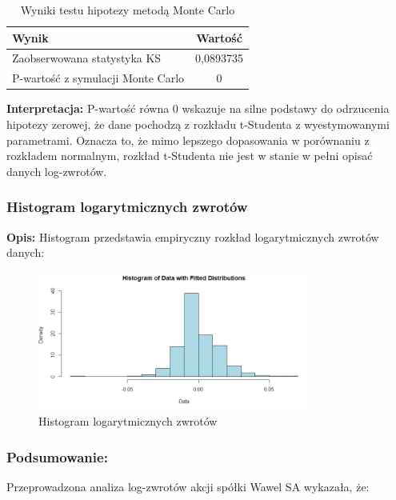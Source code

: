 \documentclass[a4paper,11pt]{article}
\begin{document}
\begin{table}[H]
    \centering
    \begin{tabular}{|p{7cm}|c|}
        \hline
        \textbf{Wynik} & \textbf{Wartość} \\
        \hline
        Zaobserwowana statystyka KS & 0,0893735 \\
        P-wartość z symulacji Monte Carlo & 0 \\
        \hline
    \end{tabular}
    \caption{Wyniki testu hipotezy metodą Monte Carlo}
    \label{tab:test_results}
\end{table}


\textbf{Interpretacja:} P-wartość równa 0 wskazuje na silne podstawy do odrzucenia hipotezy zerowej, że dane pochodzą z rozkładu t-Studenta z wyestymowanymi parametrami. Oznacza to, że mimo lepszego dopasowania w porównaniu z rozkładem normalnym, rozkład t-Studenta nie jest w stanie w pełni opisać danych log-zwrotów.

\subsubsection*{Histogram logarytmicznych zwrotów}

\textbf{Opis:} Histogram przedstawia empiryczny rozkład logarytmicznych zwrotów danych:

\begin{figure}[H]
    \centering
    \includegraphics[width=0.8\textwidth]{./Wojtek/histogram_log_returns.png}
    \caption{Histogram logarytmicznych zwrotów}
    \label{fig:histogram_log_returns}
\end{figure}

\newpage\subsubsection{Podsumowanie:}

Przeprowadzona analiza log-zwrotów akcji spółki Wawel SA wykazała, że:
\end{document}
